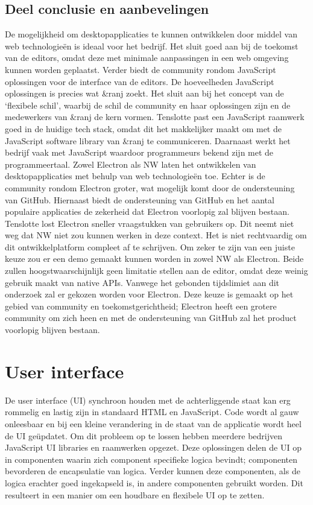 \subsection{Deel conclusie en aanbevelingen}
De mogelijkheid om desktopapplicaties te kunnen ontwikkelen door middel van web technologieën is ideaal voor het bedrijf. Het sluit goed aan bij de toekomst van de editors, omdat deze met minimale aanpassingen in een web omgeving kunnen worden geplaatst. Verder biedt de community rondom JavaScript oplossingen voor de interface van de editors. De hoeveelheden JavaScript oplossingen is precies wat \&ranj zoekt. Het sluit aan bij het concept van de ‘flexibele schil’, waarbij de schil de community en haar oplossingen zijn en de medewerkers van \&ranj de kern vormen. Tenslotte past een JavaScript raamwerk goed in de huidige tech stack, omdat dit het makkelijker maakt om met de JavaScript software library van \&ranj te communiceren. Daarnaast werkt het bedrijf vaak met JavaScript waardoor programmeurs bekend zijn met de programmeertaal.
Zowel Electron als NW laten het ontwikkelen van desktopapplicaties met behulp van web technologieën toe. Echter is de community rondom Electron groter, wat mogelijk komt door de ondersteuning van GitHub. Hiernaast biedt de ondersteuning van GitHub en het aantal populaire applicaties de zekerheid dat Electron voorlopig zal blijven bestaan. Tenslotte lost Electron sneller vraagstukken van gebruikers op.
Dit neemt niet weg dat NW niet zou kunnen werken in deze context. Het is niet rechtvaardig om dit ontwikkelplatform compleet af te schrijven. Om zeker te zijn van een juiste keuze zou er een demo gemaakt kunnen worden in zowel NW als Electron. Beide zullen hoogstwaarschijnlijk geen limitatie stellen aan de editor, omdat deze weinig gebruik maakt van native APIs. Vanwege het gebonden tijdslimiet aan dit onderzoek zal er gekozen worden voor Electron. Deze keuze is gemaakt op het gebied van community en toekomstgerichtheid; Electron heeft een grotere community om zich heen en met de ondersteuning van GitHub zal het product voorlopig blijven bestaan.

\section{User interface}
De user interface (UI) synchroon houden met de achterliggende staat kan erg rommelig en lastig zijn in standaard HTML en JavaScript. Code wordt al gauw onleesbaar en bij een kleine verandering in de staat van de applicatie wordt heel de UI geüpdatet. Om dit probleem op te lossen hebben meerdere bedrijven JavaScript UI libraries en raamwerken opgezet. Deze oplossingen delen de UI op in componenten waarin zich component specifieke logica bevindt; componenten bevorderen de encapsulatie van logica. Verder kunnen deze componenten, als de logica erachter goed ingekapseld is, in andere componenten gebruikt worden. Dit resulteert in een manier om een houdbare en flexibele UI op te zetten.

